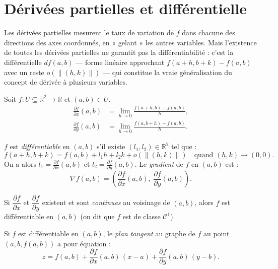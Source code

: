 \documentclass[11pt,a4paper,twoside]{book}
\newcommand{\R}{\mathbb{R}}
\begin{document}
\section{Dérivées partielles et différentielle}

Les dérivées partielles mesurent le taux de variation de $f$ dans chacune des directions des axes coordonnés, en « gelant » les autres variables. Mais l'existence de toutes les dérivées partielles ne garantit pas la différentiabilité : c'est la différentielle $df(a,b)$ — forme linéaire approchant $f(a+h,b+k) - f(a,b)$ avec un reste $o(\|(h,k)\|)$ — qui constitue la vraie généralisation du concept de dérivée à plusieurs variables.

\begin{definitionbox}
Soit $f : U \subseteq \R^2 \to \R$ et $(a,b) \in U$.
\begin{align*}
  \frac{\partial f}{\partial x}(a,b) &= \lim_{h \to 0} \frac{f(a+h,b) - f(a,b)}{h}, \\
  \frac{\partial f}{\partial y}(a,b) &= \lim_{h \to 0} \frac{f(a,b+h) - f(a,b)}{h}.
\end{align*}
\end{definitionbox}

\begin{definitionbox}
$f$ est \emph{différentiable} en $(a,b)$ s'il existe $(l_1,l_2) \in \R^2$ tel que :
\[
  f(a+h,b+k) = f(a,b) + l_1 h + l_2 k + o\!\left(\|(h,k)\|\right) \quad \text{quand } (h,k) \to (0,0).
\]
On a alors $l_1 = \frac{\partial f}{\partial x}(a,b)$ et $l_2 = \frac{\partial f}{\partial y}(a,b)$.
Le \emph{gradient} de $f$ en $(a,b)$ est :
\[
  \nabla f(a,b) = \left(\frac{\partial f}{\partial x}(a,b),\;\frac{\partial f}{\partial y}(a,b)\right).
\]
\end{definitionbox}

\begin{theoremebox}
Si $\dfrac{\partial f}{\partial x}$ et $\dfrac{\partial f}{\partial y}$ existent et sont
\emph{continues} au voisinage de $(a,b)$, alors $f$ est différentiable en $(a,b)$
(on dit que $f$ est de classe $\mathcal{C}^1$).
\end{theoremebox}

\begin{definitionbox}
Si $f$ est différentiable en $(a,b)$, le \emph{plan tangent} au graphe de $f$
au point $(a,b,f(a,b))$ a pour équation :
\[
  z = f(a,b) + \frac{\partial f}{\partial x}(a,b)\,(x-a) + \frac{\partial f}{\partial y}(a,b)\,(y-b).
\]
\end{definitionbox}
\end{document}
